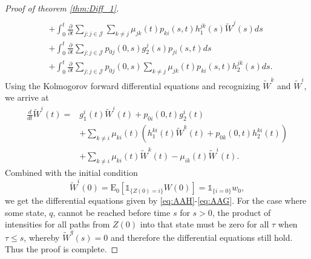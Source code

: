 \documentclass[12pt]{article}
\newcommand{\E}{\text{E}}
\newcommand{\indic}[1]{\mathds{1}_{ \{ #1 \} }}
\theoremstyle{my_thm}
\begin{document}
\begin{proof}[Proof of theorem \ref{thm:Diff_1}]
\begin{align*}
\\
&+
\int_0^t \frac{\partial}{\partial t}  \sum_{j:j \in \mathcal{J}} \sum_{k \neq j}  \mu_{jk}(t) p_{ki}(s,t)  h^{jk}_1(s) \tilde{W}^j(s)   ds
\\
&+
\int_0^t \frac{\partial}{\partial t}  \sum_{j:j \in \mathcal{J}} p_{0j}(0,s)g_2^j(s)p_{ji}(s,t) ds
\\
&+
\int_0^t \frac{\partial}{\partial t} \sum_{j:j \in \mathcal{J}} p_{0j}(0,s)  \sum_{k \neq j}  \mu_{jk}(t) p_{ki}(s,t)h_2^{jk}(s) ds.
\end{align*}
Using the Kolmogorov forward differential equations and recognizing $\tilde{W}^k$ and $\tilde{W}^i$, we arrive at
\begin{align*}
\frac{d}{dt}\tilde{W}^i(t)=&
g^i_1(t) \tilde{W}^i(t) +p_{0i}(0,t)g^i_2(t)\\
&+
\sum_{k \neq i} \mu_{ki}(t) \left(   h^{ki}_1(t) \tilde{W}^k(t) + p_{0k}(0,t)h^{ki}_2(t) \right)
\\
&+
\sum_{k \neq i} \mu_{ki}(t) \tilde{W}^k(t)-\mu_{ik}(t)\tilde{W}^i(t).
\end{align*}
Combined with the initial condition
$$
\tilde{W}^i(0)=\E_0[\indic{Z(0)=i}W(0)]=\indic{i=0}w_0,
$$
we get the differential equations given by \eqref{eq:AAH}-\eqref{eq:AAG}. For the case where some state, $q$, cannot be reached before time $s$ for $s>0$, the product of intensities for all paths from $Z(0)$ into that state must be zero for all $\tau$ when $\tau \leq s$, whereby $\tilde{W}^q(s)=0$ and therefore the differential equations still hold. Thus the proof is complete.
\end{proof}

\iffalse
\end{document}
